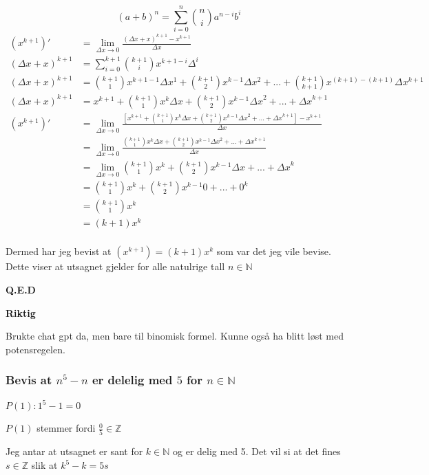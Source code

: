 \documentclass{article}
\begin{document}
$$(a+b)^n=\sum_{i=0}^{n}\binom{n}{i}a^{n-i}b^i$$
\begin{align*}
    (x^{k+1})' &= \lim_{\Delta x \rightarrow 0} \frac{(\Delta x + x)^{k+1} - x^{k+1}}{\Delta x} \\
    (\Delta x + x)^{k+1} &= \sum_{i=0}^{k+1}\binom{k+1}{i}x^{k+1-i}\Delta^i \\
    (\Delta x + x)^{k+1} &= \binom{k+1}{1}x^{k+1-1}\Delta x^1+\binom{k+1}{2}x^{k-1}\Delta x^2+...+\binom{k+1}{k+1}x^{(k+1)-(k+1)} \Delta x ^{k+1} \\
    (\Delta x + x)^{k+1} &= x^{k+1}+\binom{k+1}{1}x^k\Delta x + \binom{k+1}{2}x^{k-1}{\Delta x} ^2+...+{\Delta x}^{k+1} \\
    (x^{k+1})' &= \lim_{\Delta x \rightarrow 0} \frac{[x^{k+1}+\binom{k+1}{1}x^k\Delta x + \binom{k+1}{2}x^{k-1}{\Delta x} ^2+...+{\Delta x}^{k+1}] - x^{k+1}}{\Delta x} \\
    &= \lim_{\Delta x \rightarrow 0} \frac{\binom{k+1}{1}x^k\Delta x + \binom{k+1}{2}x^{k-1}{\Delta x} ^2+...+{\Delta x}^{k+1}}{\Delta x} \\
    &= \lim_{\Delta x \rightarrow 0} \binom{k+1}{1}x^k + \binom{k+1}{2} x^{k-1} \Delta x + ... + {\Delta x}^k \\
    &= \binom{k+1}{1}x^k+\binom{k+1}{2}x^{k-1}0+...+0^k \\
    &= \binom{k+1}{1}x^k \\
    &= (k+1)x^k \\
\end{align*}

Dermed har jeg bevist at $(x^{k+1})=(k+1)x^k$ som var det jeg vile bevise. Dette viser at utsagnet gjelder for alle natulrige tall $n \in \mathbb{N}$

\textbf{Q.E.D}

\textbf{Riktig}

Brukte chat gpt da, men bare til binomisk formel. Kunne også ha blitt løst med potensregelen.

\newpage

\subsubsection{Bevis at $n^5-n$ er delelig med $5$ for $n \in \mathbb{N}$}

$P(1): 1^5-1=0$

$P(1)$ stemmer fordi $\frac{0}{5}\in \mathbb{Z}$

Jeg antar at utsagnet er sant for $k \in \mathbb{N}$ og er delig med 5. Det vil si at det fines $s \in \mathbb{Z}$ slik at $k^5-k=5s$
\end{document}
